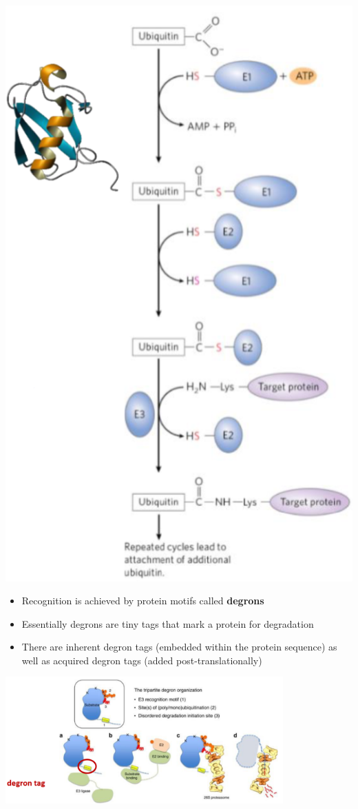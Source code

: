 \documentclass[10pt]{article}
\begin{document}
\begin{center}
    \includegraphics*[scale=0.5]{L1_6.png}
\end{center}
\begin{itemize}
    \item Recognition is achieved by protein motifs called \textbf{degrons}
    \item Essentially degrons are tiny tags that mark a protein for degradation
    \item There are inherent degron tags (embedded within the protein sequence) as well as acquired degron tags (added post-translationally)
\end{itemize}
\begin{center}
    \includegraphics*[width=0.8\textwidth]{L1_7.png}
\end{center}
\end{document}
